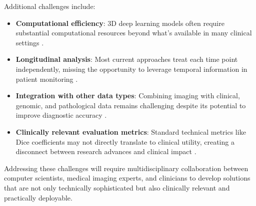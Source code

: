 Additional challenges include:

\begin{itemize}
  \item \textbf{Computational efficiency}: 3D deep learning models often require substantial computational resources beyond what's available in many clinical settings \cite{Kamnitsas2017}.
  \item \textbf{Longitudinal analysis}: Most current approaches treat each time point independently, missing the opportunity to leverage temporal information in patient monitoring \cite{Weninger2018}.
  \item \textbf{Integration with other data types}: Combining imaging with clinical, genomic, and pathological data remains challenging despite its potential to improve diagnostic accuracy \cite{Bakas2019}.
  \item \textbf{Clinically relevant evaluation metrics}: Standard technical metrics like Dice coefficients may not directly translate to clinical utility, creating a disconnect between research advances and clinical impact \cite{MaierHein2018}.
\end{itemize}

Addressing these challenges will require multidisciplinary collaboration between computer scientists, medical imaging experts, and clinicians to develop solutions that are not only technically sophisticated but also clinically relevant and practically deployable.
